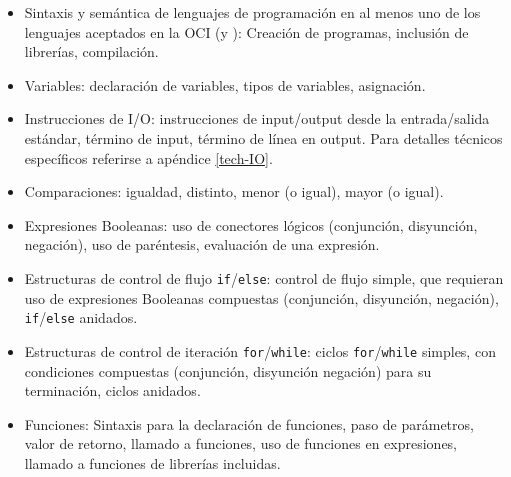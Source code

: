 \begin{itemize}

\item[\basic] Sintaxis y semántica de lenguajes de programación en al menos uno
  de los lenguajes aceptados en la OCI (\java y \cpp): Creación de programas, inclusión de librerías, compilación.

\item[\basic] Variables: declaración de variables, tipos de variables, asignación.

\item[\basic] Instrucciones de I/O: instrucciones de input/output desde la
  entrada/salida estándar, término de input, término de línea en output.
  Para detalles técnicos específicos referirse a apéndice \ref{tech-IO}.

\item[\basic] Comparaciones: igualdad, distinto, menor (o igual), mayor (o igual).

\item[\basic] Expresiones Booleanas: uso de conectores lógicos (conjunción, disyunción, negación), uso de paréntesis, evaluación de una expresión.

\item[\basic] Estructuras de control de flujo \texttt{if}/\texttt{else}: control de flujo simple, que requieran uso de expresiones Booleanas compuestas (conjunción, disyunción, negación), \texttt{if}/\texttt{else} anidados.

\item[\basic] Estructuras de control de iteración \texttt{for}/\texttt{while}: ciclos \texttt{for}/\texttt{while} simples, con condiciones compuestas (conjunción, disyunción negación) para su terminación, ciclos anidados.

\item[\basic] Funciones: Sintaxis para la declaración de funciones, paso de parámetros, valor de retorno, llamado a funciones, uso
de funciones en expresiones, llamado a funciones de librerías incluidas.
\end{itemize}


